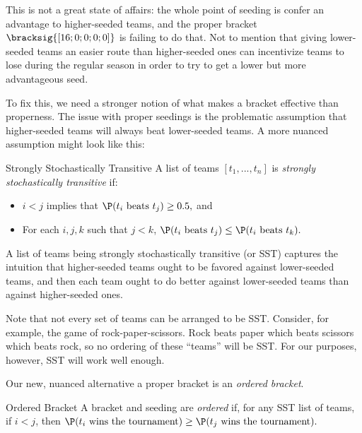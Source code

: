{This is not a great state of affairs: the whole point of seeding is confer an advantage to higher-seeded teams, and the proper bracket $\bracksig{[16; 0; 0; 0; 0]}$ is failing to do that. Not to mention that giving lower-seeded teams an easier route than higher-seeded ones can incentivize teams to lose during the regular season in order to try to get a lower but more advantageous seed.

To fix this, we need a stronger notion of what makes a bracket effective than properness. The issue with proper seedings is the problematic assumption that higher-seeded teams will always beat lower-seeded teams. A more nuanced assumption might look like this:

\begin{definition}{Strongly Stochastically Transitive \cite{stochastic_is_this_paper_even_real}}{}
    A list of teams $[t_1, ..., t_n]$ is \textit{strongly stochastically transitive} if:
    \begin{itemize}
        \item $i < j$ implies that $\P(t_i \textrm{ beats } t_j) \geq 0.5,$ and
        \item For each $i, j, k$ such that $j < k$, $\P(t_i \textrm{ beats } t_j) \leq \P(t_i \textrm{ beats } t_k).$
    \end{itemize}
\end{definition}
A list of teams being strongly stochastically transitive (or SST) captures the intuition that higher-seeded teams ought to be favored against lower-seeded teams, and then each team ought to do better against lower-seeded teams than against higher-seeded ones.

Note that not every set of teams can be arranged to be SST. Consider, for example, the game of rock-paper-scissors. Rock beats paper which beats scissors which beats rock, so no ordering of these ``teams'' will be SST. For our purposes, however, SST will work well enough.

Our new, nuanced alternative a proper bracket is an \textit{ordered bracket}.

\begin{definition}{Ordered Bracket \cite{four_eight_ordered}}{}
    A bracket and seeding are \textit{ordered} if, for any SST list of teams, if $i < j$, then $\P(t_i\textrm{ wins the tournament} )\geq \P(t_j\textrm{ wins the tournament}).$
\end{definition}

}
